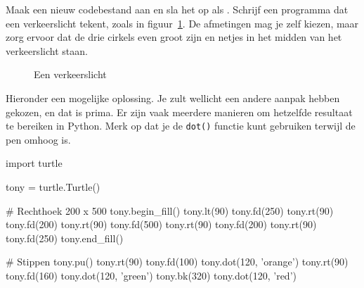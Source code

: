 \documentclass[../main]{subfiles}
\begin{document}
\begin{opgave}[icons={laptop}]
Maak een nieuw codebestand aan en sla het op als . Schrijf een programma dat een verkeerslicht tekent, zoals in figuur~\ref{fig:turtle-traffic-light}. De afmetingen mag je zelf kiezen, maar zorg ervoor dat de drie cirkels even groot zijn en netjes in het midden van het verkeerslicht staan.

\begin{figure}[ht]
    \centering
    \caption{Een verkeerslicht}%
    \label{fig:turtle-traffic-light}
\end{figure}

\end{opgave}
\begin{antwoord}
Hieronder een mogelijke oplossing. Je zult wellicht een andere aanpak hebben gekozen, en dat is prima. Er zijn vaak meerdere manieren om hetzelfde resultaat te bereiken in Python. Merk op dat je de \texttt{dot()} functie kunt gebruiken terwijl de pen omhoog is.
\begin{python-breakable}[style=mu-noframe]
import turtle

tony = turtle.Turtle()

# Rechthoek 200 x 500
tony.begin_fill()
tony.lt(90)
tony.fd(250)
tony.rt(90)
tony.fd(200)
tony.rt(90)
tony.fd(500)
tony.rt(90)
tony.fd(200)
tony.rt(90)
tony.fd(250)
tony.end_fill()

# Stippen
tony.pu()
tony.rt(90)
tony.fd(100)
tony.dot(120, 'orange')
tony.rt(90)
tony.fd(160)
tony.dot(120, 'green')
tony.bk(320)
tony.dot(120, 'red')
\end{python-breakable}
\end{antwoord}
\end{document}
